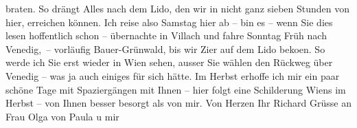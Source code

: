\begin{ledgroupsized}[t]{13cm}
               braten. So drängt Alles nach dem Lido, den wir in
               nicht ganz sieben Stunden von hier, erreichen können.\pend
           \pstart
           {\pb}Ich reise also Samstag hier ab –
               bin es – wenn Sie dies lesen hoffentlich schon – übernachte in Villach und fahre Sonntag Früh nach Venedig, – vorläufig Bauer-Grünwald, bis wir Zi{\geminationm}er auf dem Lido beko{\geminationm}en. So
               werde ich Sie erst wieder in Wien sehen, ausser
               Sie wählen den Rückweg über Venedig – was ja auch
               einiges für sich hätte. Im Herbst erhoffe ich mir  ein paar schöne Tage mit Spaziergängen mit Ihnen –
               hier folgt eine Schilderung Wiens im Herbst – von
               Ihnen besser besorgt als von mir. Von Herzen\pend
           \pstart Ihr \spacefill\mbox{Richard}\pend{}\pstart
           Grüsse an Frau Olga von Paula u mir\pend
           
         
         \endnumbering{}\end{ledgroupsized}  \newcommand{\dateiname}{L01703}\newcommand{\titel}{Richard Beer-Hofmann an Arthur Schnitzler, 29. 8. 1907}\newcommand{\editorInnen}{Martin Anton Müller und Gerd-Hermann Susen}
      